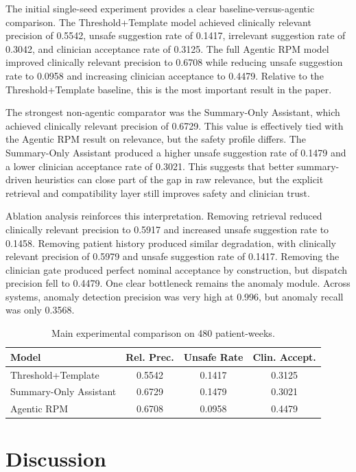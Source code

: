 \documentclass[conference]{IEEEtran}
\begin{document}
The initial single-seed experiment provides a clear baseline-versus-agentic comparison. The Threshold+Template model achieved clinically relevant precision of 0.5542, unsafe suggestion rate of 0.1417, irrelevant suggestion rate of 0.3042, and clinician acceptance rate of 0.3125. The full Agentic RPM model improved clinically relevant precision to 0.6708 while reducing unsafe suggestion rate to 0.0958 and increasing clinician acceptance to 0.4479. Relative to the Threshold+Template baseline, this is the most important result in the paper.

The strongest non-agentic comparator was the Summary-Only Assistant, which achieved clinically relevant precision of 0.6729. This value is effectively tied with the Agentic RPM result on relevance, but the safety profile differs. The Summary-Only Assistant produced a higher unsafe suggestion rate of 0.1479 and a lower clinician acceptance rate of 0.3021. This suggests that better summary-driven heuristics can close part of the gap in raw relevance, but the explicit retrieval and compatibility layer still improves safety and clinician trust.

Ablation analysis reinforces this interpretation. Removing retrieval reduced clinically relevant precision to 0.5917 and increased unsafe suggestion rate to 0.1458. Removing patient history produced similar degradation, with clinically relevant precision of 0.5979 and unsafe suggestion rate of 0.1417. Removing the clinician gate produced perfect nominal acceptance by construction, but dispatch precision fell to 0.4479. One clear bottleneck remains the anomaly module. Across systems, anomaly detection precision was very high at 0.996, but anomaly recall was only 0.3568.

\begin{table}[t]
\caption{Main experimental comparison on 480 patient-weeks.}
\label{tab:main-results}
\centering
\begin{tabular}{lccc}
\toprule
Model & Rel. Prec. & Unsafe Rate & Clin. Accept. \\
\midrule
Threshold+Template & 0.5542 & 0.1417 & 0.3125 \\
Summary-Only Assistant & 0.6729 & 0.1479 & 0.3021 \\
Agentic RPM & 0.6708 & 0.0958 & 0.4479 \\
\bottomrule
\end{tabular}
\end{table}

\section{Discussion}
\end{document}
